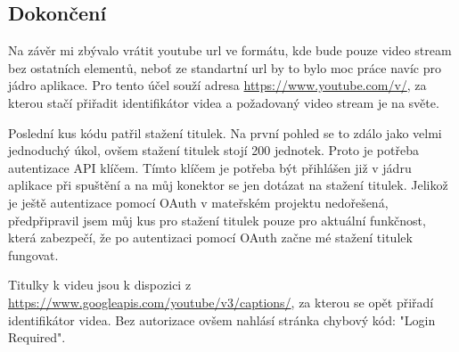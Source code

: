 \subsection{Dokončení}
\par Na závěr mi zbývalo vrátit youtube url ve formátu, kde bude pouze video stream bez ostatních elementů, neboť ze standartní url by to bylo moc práce navíc pro jádro aplikace. Pro tento účel souží adresa \url{https://www.youtube.com/v/}, za kterou stačí přiřadit identifikátor videa a požadovaný video stream je na světe. 
\par Poslední kus kódu patřil stažení titulek. Na první pohled se to zdálo jako velmi jednoduchý úkol, ovšem stažení titulek stojí 200 jednotek. Proto je potřeba autentizace API klíčem. Tímto klíčem je potřeba být přihlášen již v jádru aplikace při spuštění a na můj konektor se jen dotázat na stažení titulek. Jelikož je ještě autentizace pomocí OAuth v mateřském projektu nedořešená, předpřipravil jsem můj kus pro stažení titulek pouze pro aktuální funkčnost, která zabezpečí, že po autentizaci pomocí OAuth začne mé stažení titulek fungovat.
\par Titulky k videu jsou k dispozici z \url{https://www.googleapis.com/youtube/v3/captions/}, za kterou se opět přiřadí identifikátor videa. Bez autorizace ovšem nahlásí stránka chybový kód: "Login Required".
